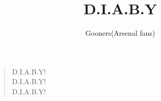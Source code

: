 \documentclass[a4paper,12pt]{article}
\title{D.I.A.B.Y}
\author{Gooners(Arsenal fans)}
\date{}
\begin{document}
	
	\maketitle
	
	\begin{verse}
		
		D.I.A.B.Y! \\
		D.I.A.B.Y! \\
		D.I.A.B.Y!
		
	\end{verse}
	
\end{document}
